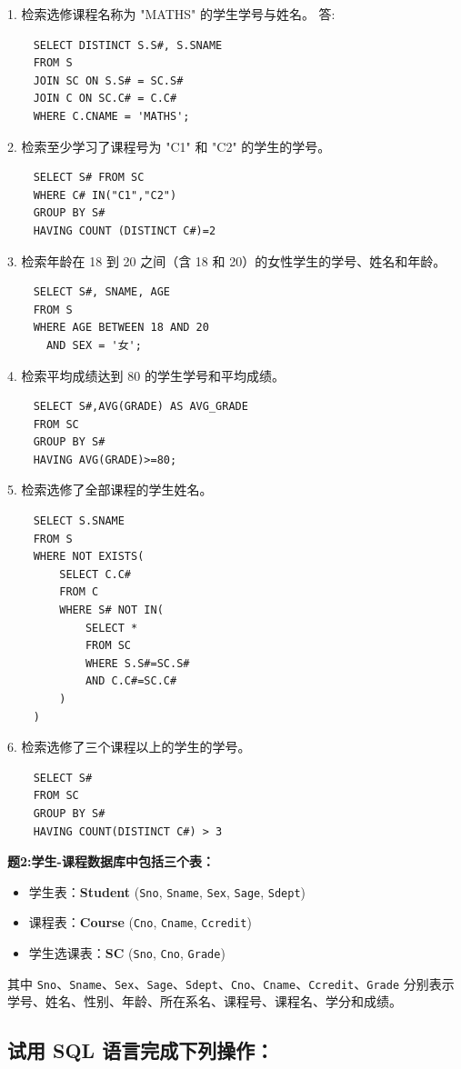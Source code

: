 \documentclass[a4paper,12pt,UTF8]{ctexart}
\begin{document}
1. 检索选修课程名称为 "MATHS" 的学生学号与姓名。
答:\begin{lstlisting}
    SELECT DISTINCT S.S#, S.SNAME
    FROM S
    JOIN SC ON S.S# = SC.S#
    JOIN C ON SC.C# = C.C#
    WHERE C.CNAME = 'MATHS';
\end{lstlisting}
2. 检索至少学习了课程号为 "C1" 和 "C2" 的学生的学号。
\begin{lstlisting}
    SELECT S# FROM SC
    WHERE C# IN("C1","C2")
    GROUP BY S#
    HAVING COUNT (DISTINCT C#)=2
\end{lstlisting}
3. 检索年龄在 18 到 20 之间（含 18 和 20）的女性学生的学号、姓名和年龄。
\begin{lstlisting}
    SELECT S#, SNAME, AGE
    FROM S
    WHERE AGE BETWEEN 18 AND 20
      AND SEX = '女'; 
\end{lstlisting}
4. 检索平均成绩达到 80 的学生学号和平均成绩。
\begin{lstlisting}
    SELECT S#,AVG(GRADE) AS AVG_GRADE
    FROM SC
    GROUP BY S#
    HAVING AVG(GRADE)>=80;
\end{lstlisting}
5. 检索选修了全部课程的学生姓名。
\begin{lstlisting}
    SELECT S.SNAME
    FROM S 
    WHERE NOT EXISTS(
        SELECT C.C#
        FROM C 
        WHERE S# NOT IN(
            SELECT *
            FROM SC
            WHERE S.S#=SC.S#
            AND C.C#=SC.C#
        )
    )
\end{lstlisting}
6. 检索选修了三个课程以上的学生的学号。
\begin{lstlisting}
    SELECT S#
    FROM SC
    GROUP BY S#
    HAVING COUNT(DISTINCT C#) > 3 
\end{lstlisting}
\textbf{题2:学生-课程数据库中包括三个表：}\\
\begin{itemize}
    \item 学生表：\textbf{Student} (\texttt{Sno}, \texttt{Sname}, \texttt{Sex}, \texttt{Sage}, \texttt{Sdept})
    \item 课程表：\textbf{Course} (\texttt{Cno}, \texttt{Cname}, \texttt{Ccredit})
    \item 学生选课表：\textbf{SC} (\texttt{Sno}, \texttt{Cno}, \texttt{Grade})
\end{itemize}

其中 \texttt{Sno}、\texttt{Sname}、\texttt{Sex}、\texttt{Sage}、\texttt{Sdept}、\texttt{Cno}、\texttt{Cname}、\texttt{Ccredit}、\texttt{Grade} 分别表示学号、姓名、性别、年龄、所在系名、课程号、课程名、学分和成绩。

\subsection*{试用 SQL 语言完成下列操作：}
\end{document}
